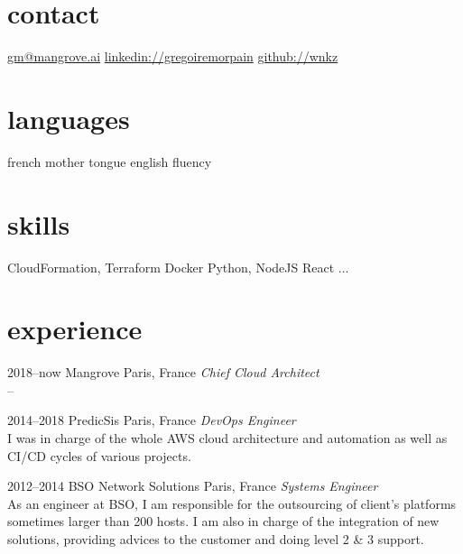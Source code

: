 \documentclass[]{cv-a4}
\begin{document}


\begin{aside} %
\section{contact}
\href{mailto:gm@mangrove.ai}{gm@mangrove.ai}
\href{https://www.linkedin.com/in/gregoiremorpain/en}{linkedin://gregoiremorpain}
\href{https://github.com/wnkz}{github://wnkz}
\section{languages}
french mother tongue
english fluency
\section{skills}
CloudFormation, Terraform
Docker
Python, NodeJS
React
...
\end{aside}


\section{experience}

\begin{entrylist}


\entry
{2018--now}
{Mangrove}
{Paris, France}
{\emph{Chief Cloud Architect} \\
--}

\entry
{2014--2018}
{PredicSis}
{Paris, France}
{\emph{DevOps Engineer} \\
I was in charge of the whole AWS cloud architecture and automation as well as CI/CD cycles of various projects.}

\entry
{2012--2014}
{BSO Network Solutions}
{Paris, France}
{\emph{Systems Engineer} \\
As an engineer at BSO, I am responsible for the outsourcing of client's platforms sometimes larger than 200 hosts. I am also in charge of the integration of new solutions, providing advices to the customer and doing level 2 \& 3 support.}


\end{entrylist}
\end{document}
